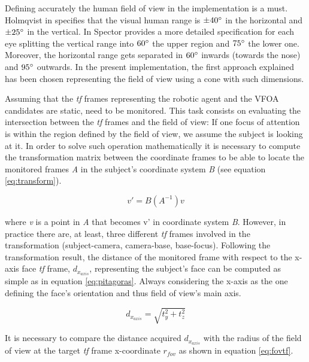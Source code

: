 \documentclass{sig-alternate}
\begin{document}
Defining accurately the human field of view in the implementation is a must.
Holmqvist in \cite{holmqvist2011eye} specifies that the visual human range is $
\pm  40\degree $ in the horizontal and $ \pm 25\degree $ in the vertical. In
\cite{walker1980clinical} Spector provides a more detailed specification for
each eye splitting the vertical range into $ 60\degree $ the upper region and $
75\degree $ the lower one. Moreover, the horizontal range gets separated in $
60\degree $ inwards (towards the nose) and $ 95\degree $ outwards. In the
present implementation, the first approach explained has been chosen
representing the field of view using a cone with such dimensions.

Assuming that the \textit{tf} frames representing the robotic agent and the VFOA
candidates are static, need to be monitored. This task consists on evaluating
the intersection between the \textit{tf} frames and the field of view: If one
focus of attention is within the region defined by the field of view, we assume
the subject is looking at it. In order to solve such operation mathematically it
is necessary to compute the transformation matrix between the coordinate frames
to be able to locate the monitored frames \textit{A} in the subject's coordinate
system \textit{B} (see equation \ref{eq:transform}).

\begin{equation}
v' = B(A^{-1})v
\label{eq:transform}
\end{equation}

where \textit{v} is a point in \textit{A} that becomes v' in coordinate system
\textit{B}. However, in practice there are, at least, three different
\textit{tf} frames involved in the transformation (subject-camera, camera-base,
base-focus). Following the transformation result, the distance of the monitored
frame with respect to the x-axis face \textit{tf} frame, $ d_{x_{axis}} $,
representing the subject's face can be computed as simple as in equation
\ref{eq:pitagoras}. Always considering the x-axis as the one defining the face's
orientation and thus field of view's main axis.

\begin{equation}
d_{x_{axis}} = \sqrt{t_y^2 + t_z^2}
\label{eq:pitagoras}
\end{equation}

It is necessary to compare the distance acquired $ d_{x_{axis}} $ with the
radius of the field of view at the target \textit{tf} frame x-coordinate $
r_{fov} $ as shown in equation \ref{eq:fovtf}.
\end{document}
